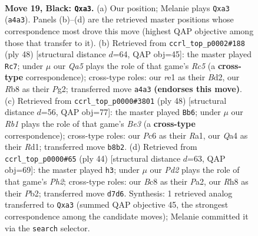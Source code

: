 \documentclass[11pt]{article}
\begin{document}
\clearpage

\begin{figure}[p]\centering
\begin{subfigure}{0.46\textwidth}\centering
\resizebox{\linewidth}{!}{%
\newchessgame
\chessboard[
  setfen={1rb1k2r/p1pp1pp1/2p4p/4P3/q7/P2BQ3/P1P5/R2KR3 b k - 9 19},
  showmover=false,
  pgfstyle=straightmove, color=movearrow, markmove={a4-a3}
]}
\caption{}
\end{subfigure}\hfill
\begin{subfigure}{0.46\textwidth}\centering
\resizebox{\linewidth}{!}{%
\newchessgame
\chessboard[
  setfen={1rbrq1k1/p4pp1/7p/2R5/1P1pPR2/P2Q4/3B2PP/6K1 w - - 0 25},
  showmover=false,
  pgfstyle=straightmove, color=movearrow, markmove={c5-c7}
]}
\caption{}
\end{subfigure}
\\[4pt]
\begin{subfigure}{0.46\textwidth}\centering
\resizebox{\linewidth}{!}{%
\newchessgame
\chessboard[
  setfen={2k4r/2qrb3/p3pp2/P2p3p/7Q/1pP1BP2/1P3P1P/R2R1K2 w - - 1 25},
  showmover=false,
  pgfstyle=straightmove, color=movearrow, markmove={e3-b6}
]}
\caption{}
\end{subfigure}\hfill
\begin{subfigure}{0.46\textwidth}\centering
\resizebox{\linewidth}{!}{%
\newchessgame
\chessboard[
  setfen={1k1r4/1pqb2p1/p4p1p/3p4/3Q1PP1/2P1RB2/PP5P/1K6 w - - 0 23},
  showmover=false,
  pgfstyle=straightmove, color=movearrow, markmove={h2-h3}
]}
\caption{}
\end{subfigure}
\caption{\textbf{Move 19, Black: \texttt{Qxa3}.} (a) Our position; Melanie plays \texttt{Qxa3} (\texttt{a4a3}). Panels (b)--(d) are the retrieved master positions whose correspondence most drove this move (highest QAP objective among those that transfer to it). (b) Retrieved from \texttt{ccrl\_top\_p0002\#188} (ply 48) [structural distance $d$=64, QAP obj=45]: the master played \texttt{Rc7}; under $\mu$ our \emph{Qa5} plays the role of that game's \emph{Rc5} (a \textbf{cross-type} correspondence); cross-type roles: our \emph{r}e1 as their \emph{B}d2, our \emph{R}b8 as their \emph{P}g2; transferred move \texttt{a4a3} \textbf{(endorses this move)}. (c) Retrieved from \texttt{ccrl\_top\_p0000\#3801} (ply 48) [structural distance $d$=56, QAP obj=77]: the master played \texttt{Bb6}; under $\mu$ our \emph{Rb1} plays the role of that game's \emph{Be3} (a \textbf{cross-type} correspondence); cross-type roles: our \emph{P}c6 as their \emph{R}a1, our \emph{Q}a4 as their \emph{R}d1; transferred move \texttt{b8b2}. (d) Retrieved from \texttt{ccrl\_top\_p0000\#65} (ply 44) [structural distance $d$=63, QAP obj=69]: the master played \texttt{h3}; under $\mu$ our \emph{Pd2} plays the role of that game's \emph{Ph2}; cross-type roles: our \emph{B}c8 as their \emph{P}a2, our \emph{R}h8 as their \emph{P}b2; transferred move \texttt{d7d6}. Synthesis: 1 retrieved analog transferred to \texttt{Qxa3} (summed QAP objective 45, the strongest correspondence among the candidate moves); Melanie committed it via the \texttt{search} selector.}
\label{fig:thought-m37}
\end{figure}
\end{document}
